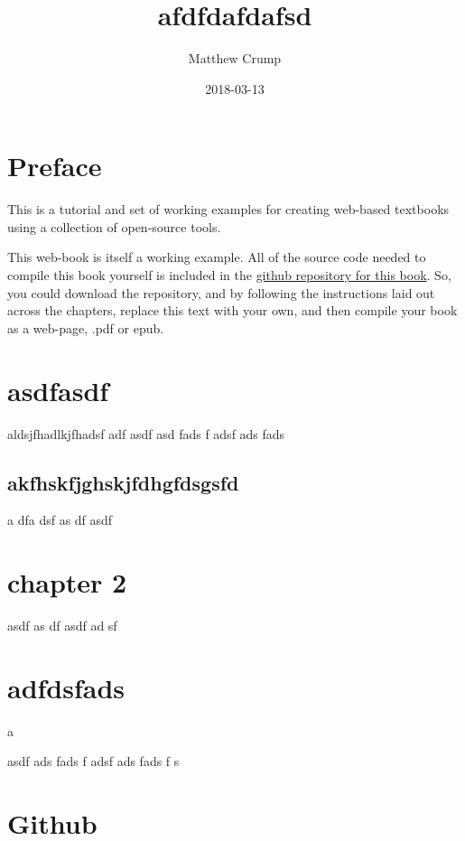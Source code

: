 \documentclass[]{book}
\title{afdfdafdafsd}
\author{Matthew Crump}
\date{2018-03-13}
\theoremstyle{definition}
\theoremstyle{definition}
\theoremstyle{definition}
\theoremstyle{remark}
\begin{document}
\maketitle

{
\setcounter{tocdepth}{1}
\tableofcontents
}
\chapter*{Preface}\label{preface}

This is a tutorial and set of working examples for creating web-based
textbooks using a collection of open-source tools.

This web-book is itself a working example. All of the source code needed
to compile this book yourself is included in the
\href{https://github.com/CrumpLab/OER_bookdown}{github repository for
this book}. So, you could download the repository, and by following the
instructions laid out across the chapters, replace this text with your
own, and then compile your book as a web-page, .pdf or epub.

\chapter{asdfasdf}\label{asdfasdf}

aldsjfhadlkjfhadsf adf asdf asd fads f adsf ads fads

\section{akfhskfjghskjfdhgfdsgsfd}\label{akfhskfjghskjfdhgfdsgsfd}

a dfa dsf as df asdf

\chapter{chapter 2}\label{chapter-2}

asdf as df asdf ad sf

\chapter{adfdsfads}\label{adfdsfads}

a

asdf ads fads f adsf ads fads f s

\chapter{Github}\label{github}
\end{document}

